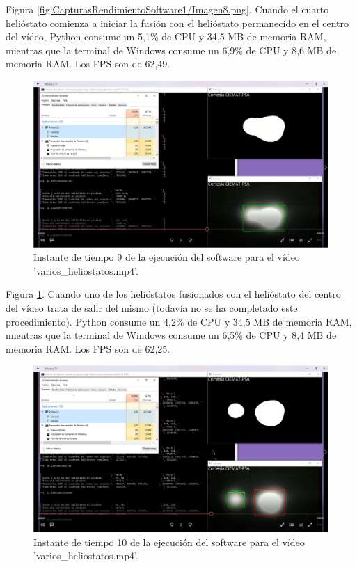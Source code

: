 Figura \ref{fig:CapturasRendimientoSoftware1/Imagen8.png}. Cuando el cuarto helióstato comienza a iniciar la fusión con el helióstato permanecido en el centro del vídeo, Python consume un 5,1\% de CPU y 34,5 MB de memoria RAM, mientras que la terminal de Windows consume un 6,9\% de CPU y 8,6 MB de memoria RAM. Los FPS son de 62,49.

\begin{figure}[h!]
  	\centering
	\includegraphics[width=\textwidth]{CapturasRendimientoSoftware1/Imagen9.png}
	\caption{Instante de tiempo 9 de la ejecución del software para el vídeo 'varios\_heliostatos.mp4'.
	\label{fig:CapturasRendimientoSoftware1/Imagen9.png}}
\end{figure}

Figura \ref{fig:CapturasRendimientoSoftware1/Imagen9.png}. Cuando uno de los helióstatos fusionados con el helióstato del centro del vídeo trata de salir del mismo (todavía no se ha completado este procedimiento). Python consume un 4,2\% de CPU y 34,5 MB de memoria RAM, mientras que la terminal de Windows consume un 6,5\% de CPU y 8,4 MB de memoria RAM. Los FPS son de 62,25.

\begin{figure}[h!]
  	\centering
	\includegraphics[width=\textwidth]{CapturasRendimientoSoftware1/Imagen10.png}
	\caption{Instante de tiempo 10 de la ejecución del software para el vídeo 'varios\_heliostatos.mp4'.
	\label{fig:CapturasRendimientoSoftware1/Imagen10.png}}
\end{figure}

